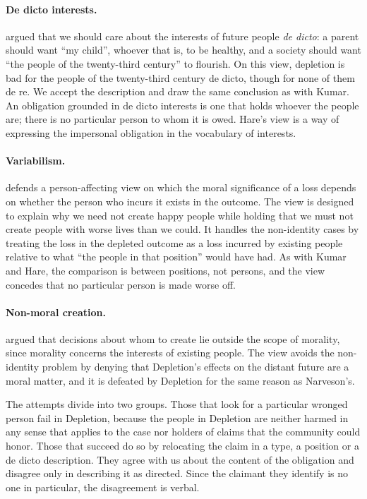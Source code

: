 \documentclass{situationist-preprint}
\begin{document}
\paragraph{De dicto interests.} \citet{Hare2007} argued that we should care about the interests of future people \emph{de dicto}: a parent should want ``my child'', whoever that is, to be healthy, and a society should want ``the people of the twenty-third century'' to flourish. On this view, depletion is bad for the people of the twenty-third century de dicto, though for none of them de re. We accept the description and draw the same conclusion as with Kumar. An obligation grounded in de dicto interests is one that holds whoever the people are; there is no particular person to whom it is owed. Hare's view is a way of expressing the impersonal obligation in the vocabulary of interests.

\paragraph{Variabilism.} \citet{Roberts2010} defends a person-affecting view on which the moral significance of a loss depends on whether the person who incurs it exists in the outcome. The view is designed to explain why we need not create happy people while holding that we must not create people with worse lives than we could. It handles the non-identity cases by treating the loss in the depleted outcome as a loss incurred by existing people relative to what ``the people in that position'' would have had. As with Kumar and Hare, the comparison is between positions, not persons, and the view concedes that no particular person is made worse off.

\paragraph{Non-moral creation.} \citet{Heyd1992} argued that decisions about whom to create lie outside the scope of morality, since morality concerns the interests of existing people. The view avoids the non-identity problem by denying that Depletion's effects on the distant future are a moral matter, and it is defeated by Depletion for the same reason as Narveson's.

The attempts divide into two groups. Those that look for a particular wronged person fail in Depletion, because the people in Depletion are neither harmed in any sense that applies to the case nor holders of claims that the community could honor. Those that succeed do so by relocating the claim in a type, a position or a de dicto description. They agree with us about the content of the obligation and disagree only in describing it as directed. Since the claimant they identify is no one in particular, the disagreement is verbal.
\end{document}
